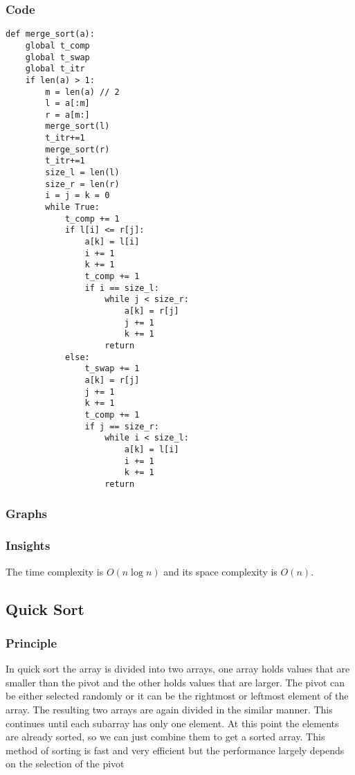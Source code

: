 \documentclass[12pt]{article}
\begin{document}
\subsubsection*{Code}
\begin{verbatim}
def merge_sort(a):
    global t_comp
    global t_swap
    global t_itr
    if len(a) > 1:
        m = len(a) // 2
        l = a[:m]
        r = a[m:]
        merge_sort(l)
        t_itr+=1
        merge_sort(r)
        t_itr+=1
        size_l = len(l)
        size_r = len(r)
        i = j = k = 0
        while True:
            t_comp += 1
            if l[i] <= r[j]:
                a[k] = l[i]
                i += 1
                k += 1
                t_comp += 1
                if i == size_l:
                    while j < size_r:
                        a[k] = r[j]
                        j += 1
                        k += 1
                    return
            else:
                t_swap += 1
                a[k] = r[j]
                j += 1
                k += 1
                t_comp += 1
                if j == size_r:
                    while i < size_l:
                        a[k] = l[i]
                        i += 1
                        k += 1
                    return
\end{verbatim}
\subsubsection*{Graphs}





\subsubsection*{Insights}
The time complexity is $O(n\log n)$ and its space complexity is $O(n)$.
\subsection{Quick Sort}
\subsubsection*{Principle}
In quick sort the array is divided into two arrays, one array
holds values that are smaller than the pivot and the other holds
values that are larger. The pivot can be either selected randomly
or it can be the rightmost or leftmost element of the array. The
resulting two arrays are again divided in the similar manner.
This continues until each subarray has only one element. At this
point the elements are already sorted, so we can just combine
them to get a sorted array. This method of sorting is fast and
very efficient but the performance largely depends on the
selection of the pivot
\end{document}
